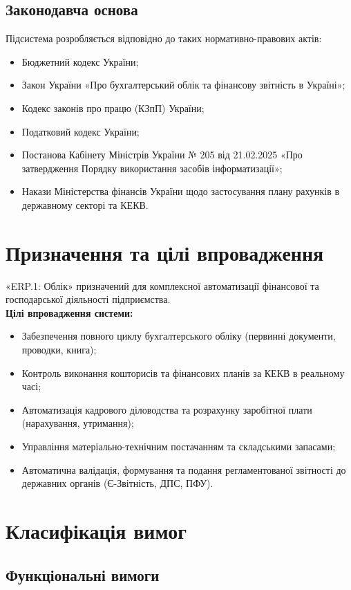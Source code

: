 \documentclass{article}
\begin{document}
\subsection{Законодавча основа}
Підсистема розробляється відповідно до таких нормативно-правових актів:
\begin{itemize}
    \item Бюджетний кодекс України;
    \item Закон України «Про бухгалтерський облік та фінансову звітність в Україні»;
    \item Кодекс законів про працю (КЗпП) України;
    \item Податковий кодекс України;
    \item Постанова Кабінету Міністрів України № 205 від 21.02.2025 «Про затвердження Порядку використання засобів інформатизації»;
    \item Накази Міністерства фінансів України щодо застосування плану рахунків в державному секторі та КЕКВ.
\end{itemize}

\section{Призначення та цілі впровадження}
«ERP.1: Облік» призначений для комплексної автоматизації фінансової та господарської діяльності підприємства.
\\
\textbf{Цілі впровадження системи:}
\begin{itemize}
    \item Забезпечення повного циклу бухгалтерського обліку (первинні документи, проводки, книга);
    \item Контроль виконання кошторисів та фінансових планів за КЕКВ в реальному часі;
    \item Автоматизація кадрового діловодства та розрахунку заробітної плати (нарахування, утримання);
    \item Управління матеріально-технічним постачанням та складськими запасами;
    \item Автоматична валідація, формування та подання регламентованої звітності до державних органів (Є-Звітність, ДПС, ПФУ).
\end{itemize}

\section{Класифікація вимог}

\subsection{Функціональні вимоги}
\end{document}
